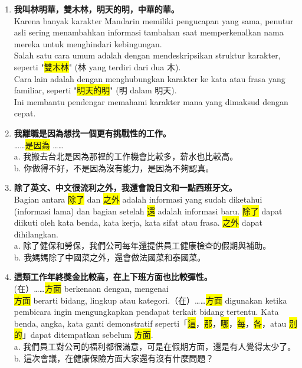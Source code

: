 \documentclass[a4paper,12pt]{ctexart}
\newcommand{\vocab}[1]{{\colorbox{yellow}{\hanwangfont #1}}}
\begin{document}
{\small
\begin{enumerate}
\item \textbf{我叫林明華，雙木林，明天的明，中華的華。}\\
Karena banyak karakter Mandarin memiliki pengucapan yang sama, penutur asli sering menambahkan informasi tambahan saat memperkenalkan nama mereka untuk menghindari kebingungan.\\
Salah satu cara umum adalah dengan mendeskripsikan struktur karakter, seperti "\vocab{雙木林}" (林 yang terdiri dari dua 木).\\
Cara lain adalah dengan menghubungkan karakter ke kata atau frasa yang familiar, seperti "\vocab{明天的明}" (明 dalam 明天).\\
Ini membantu pendengar memahami karakter mana yang dimaksud dengan cepat.

\item \textbf{我離職是因為想找一個更有挑戰性的工作。}\\
\text{[Hasil]} ……\vocab{是因為} \text{[Alasan]}…… \\
a. 我搬去台北是因為那裡的工作機會比較多，薪水也比較高。\\
b. 你做得不好，不是因為沒有能力，是因為不夠認真。

\item \textbf{除了英文、中文很流利之外，我還會說日文和一點西班牙文。}\\
Bagian antara \vocab{除了} dan \vocab{之外} adalah informasi yang sudah diketahui (informasi lama) dan bagian setelah \vocab{還} adalah informasi baru. \vocab{除了} dapat diikuti oleh kata benda, kata kerja, kata sifat atau frasa. \vocab{之外} dapat dihilangkan.\\
a. 除了健保和勞保，我們公司每年還提供員工健康檢查的假期與補助。\\
b. 我媽媽除了中國菜之外，還會做法國菜和泰國菜。

\item \textbf{這類工作年終獎金比較高，在上下班方面也比較彈性。}\\
(在）……\vocab{方面} berkenaan dengan, mengenai\\
\vocab{方面} berarti bidang, lingkup atau kategori.（在）……\vocab{方面} digunakan ketika pembicara ingin mengungkapkan pendapat terkait bidang tertentu. Kata benda, angka, kata ganti demonstratif seperti「\vocab{這}，\vocab{那}，\vocab{哪}，\vocab{每}，\vocab{各}，atau \vocab{別的}」dapat ditempatkan sebelum \vocab{方面}.\\
a. 我們員工對公司的福利都很滿意，可是在假期方面，還是有人覺得太少了。\\
b. 這次會議，在健康保險方面大家還有沒有什麼問題？
\end{enumerate}
}
\end{document}
